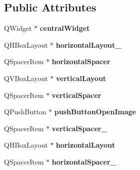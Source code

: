 \subsection*{Public Attributes}
\begin{DoxyCompactItemize}
\item 
\hypertarget{classUi__MainWindow_a30075506c2116c3ed4ff25e07ae75f81}{Q\-Widget $\ast$ {\bfseries central\-Widget}}\label{classUi__MainWindow_a30075506c2116c3ed4ff25e07ae75f81}

\item 
\hypertarget{classUi__MainWindow_a03ce63974cc69b067c91bbf285cceca8}{Q\-H\-Box\-Layout $\ast$ {\bfseries horizontal\-Layout\-\_}}\label{classUi__MainWindow_a03ce63974cc69b067c91bbf285cceca8}

\item 
\hypertarget{classUi__MainWindow_a7871ea8c4b6c595d7ccd53960b344719}{Q\-Spacer\-Item $\ast$ {\bfseries horizontal\-Spacer}}\label{classUi__MainWindow_a7871ea8c4b6c595d7ccd53960b344719}

\item 
\hypertarget{classUi__MainWindow_aecd96a04789fcfec3f98d80390ad8184}{Q\-V\-Box\-Layout $\ast$ {\bfseries vertical\-Layout}}\label{classUi__MainWindow_aecd96a04789fcfec3f98d80390ad8184}

\item 
\hypertarget{classUi__MainWindow_a8384329c3663ff274e926a12024aab52}{Q\-Spacer\-Item $\ast$ {\bfseries vertical\-Spacer}}\label{classUi__MainWindow_a8384329c3663ff274e926a12024aab52}

\item 
\hypertarget{classUi__MainWindow_aff9ad585b5d6cd73c50b65a6a1104e77}{Q\-Push\-Button $\ast$ {\bfseries push\-Button\-Open\-Image}}\label{classUi__MainWindow_aff9ad585b5d6cd73c50b65a6a1104e77}

\item 
\hypertarget{classUi__MainWindow_adc1f5fdd97fb3729999c56902d0fa591}{Q\-Spacer\-Item $\ast$ {\bfseries vertical\-Spacer\-\_}}\label{classUi__MainWindow_adc1f5fdd97fb3729999c56902d0fa591}

\item 
\hypertarget{classUi__MainWindow_acd6fdc9ebacc4b25b834162380d75ce8}{Q\-H\-Box\-Layout $\ast$ {\bfseries horizontal\-Layout}}\label{classUi__MainWindow_acd6fdc9ebacc4b25b834162380d75ce8}

\item 
\hypertarget{classUi__MainWindow_a71605bcf74c938f64207451850fc69b1}{Q\-Spacer\-Item $\ast$ {\bfseries horizontal\-Spacer\-\_}}\label{classUi__MainWindow_a71605bcf74c938f64207451850fc69b1}


\end{DoxyCompactItemize}
